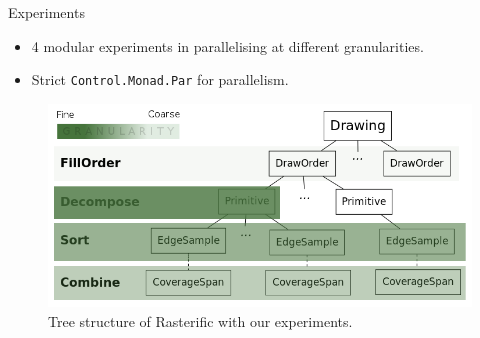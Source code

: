 \documentclass[slidestop,compress,mathserif, xcolor=table]{beamer}
\begin{document}
\begin{frame}[c]{Experiments}
\begin{itemize}
\item 4 modular experiments in parallelising at different granularities.
\item Strict \texttt{Control.Monad.Par} for parallelism.
\end{itemize}
\begin{figure}
\centering
\includegraphics[width=0.8\linewidth]{../tree}
\caption{Tree structure of Rasterific with our experiments.}
\end{figure}
\end{frame}
\end{document}
